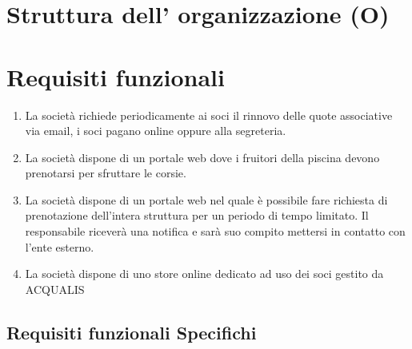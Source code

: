 \documentclass[11pt]{article} %
\begin{document}
\section{Struttura dell' organizzazione (O)}

\section{Requisiti funzionali}

\begin{enumerate}
	\item La società richiede periodicamente ai soci il rinnovo delle quote associative via email, i soci pagano online oppure alla segreteria.
	\item La società dispone di un portale web dove i fruitori della piscina devono prenotarsi per sfruttare le corsie.
	\item La società dispone di un portale web nel quale è possibile fare richiesta di prenotazione dell'intera struttura per un periodo di tempo limitato. Il responsabile riceverà una notifica e sarà suo compito mettersi in contatto con l'ente esterno.
	\item La società dispone di uno store online dedicato ad uso dei soci gestito da ACQUALIS
\end{enumerate}

\subsection{Requisiti funzionali Specifichi}
\end{document}
